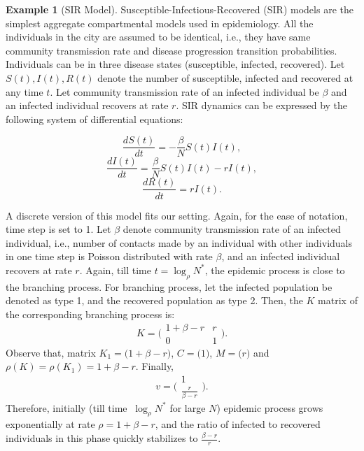 \documentclass{article}
\theoremstyle{definition}
\newtheorem{example}{Example}
\begin{document}
\begin{example}[SIR Model]{
Susceptible-Infectious-Recovered  (SIR) models are the simplest aggregate compartmental models
used in epidemiology. All the individuals in the city are assumed to be identical, i.e., they have same community transmission rate and disease progression transition probabilities. Individuals can be in three disease states (susceptible, infected, recovered). Let $S(t), I(t), R(t)$ denote the number of susceptible, infected and recovered at any time $t$. Let community transmission rate of an infected individual be $\beta$ and an infected individual recovers at rate $r$. SIR dynamics can be expressed by the following system of differential equations:

\[\frac{dS(t)}{dt} = - \frac{\beta}{N} S(t) I(t), \]
\[\frac{dI(t)}{dt} = \frac{\beta}{N} S(t) I(t) - r I(t),\]
\[\frac{dR(t)}{dt} =  r I(t).\]

A discrete version of this model fits our setting.  Again,  for the ease of notation, time step is set to 1. Let $\beta$ denote community transmission rate of an infected individual, i.e., number of contacts made by an individual with other individuals in one time step is Poisson distributed with rate $\beta$,  and an infected individual recovers at rate $r$.  Again, till time $t=\log_{\rho} N^*$, the epidemic process is close to the branching process. For branching process, let 
the infected population be denoted as type 1, and the recovered population as type 2. Then, the $K$ matrix of the corresponding 
branching process is:
\[K=\big(\begin{smallmatrix} 1+\beta -r  & r \\ 0 & 1\end{smallmatrix}\big).\]
Observe that, matrix $K_1 = \big(1+\beta-r\big)$, $C=\big(1\big)$, $M=\big(r\big)$
and $\rho(K) = \rho(K_1) = 1+\beta-r$. Finally, 
\[v = \big(\begin{smallmatrix} 1 \\ \frac{r}{\beta-r}\end{smallmatrix}\big).\]
Therefore, initially (till time $\ \log_{\rho}N^*$ for large $N$) epidemic process grows exponentially at rate $\rho = 1+\beta-r$, and the ratio of infected to recovered individuals in this phase quickly stabilizes to $\frac{\beta-r}{r}$.
}
\end{example}
\end{document}
